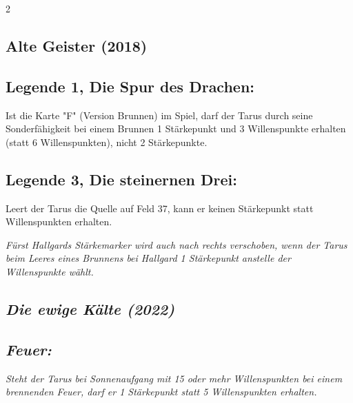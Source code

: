 \documentclass[10pt, a4paper, oneside]{book}
\newcommand{\fan}[1]{\textit{#1}}
\begin{document}
\begin{multicols*}{2}
\begin{bgcolor}
\end{bgcolor}



\columnbreak


\begin{bgcolor}[color-ag]
\section{Alte Geister (2018)}


\subsection{Legende 1, Die Spur des Drachen:}

Ist die Karte "F" (Version Brunnen) im Spiel, darf der Tarus durch seine Sonderfähigkeit bei einem Brunnen 1 Stärkepunkt und 3 Willenspunkte erhalten (statt 6 Willenspunkten), nicht 2 Stärkepunkte.
\supercite{ag-begleitheft}

\subsection{Legende 3, Die steinernen Drei:}

Leert der Tarus die Quelle auf Feld 37, kann er keinen Stärkepunkt statt Willenspunkten erhalten.
\supercite{ag-begleitheft}

\fan{Fürst Hallgards Stärkemarker wird auch nach rechts verschoben, wenn der Tarus beim Leeres eines Brunnens bei Hallgard 1 Stärkepunkt anstelle der Willenspunkte wählt.}


\end{bgcolor}



\begin{bgcolor}
\section{\fan{Die ewige Kälte (2022)}}

\subsection{\fan{Feuer:}}

\fan{Steht der Tarus bei Sonnenaufgang mit 15 oder mehr Willenspunkten bei einem brennenden Feuer, darf er 1 Stärkepunkt statt 5 Willenspunkten erhalten.}


\end{bgcolor}


\begin{bgcolor}

\end{bgcolor}
\end{multicols*}
\end{document}
